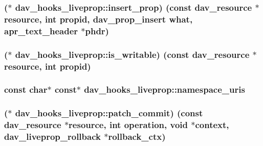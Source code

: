 \subsubsection[{\texorpdfstring{insert\+\_\+prop}{insert_prop}}]{($\ast$ dav\+\_\+hooks\+\_\+liveprop\+::insert\+\_\+prop) (const {\bf dav\+\_\+resource} $\ast${\bf resource}, {\bf int} propid, {\bf dav\+\_\+prop\+\_\+insert} {\bf what}, {\bf apr\+\_\+text\+\_\+header} $\ast${\bf phdr})}\hypertarget{structdav__hooks__liveprop_ab141270827afd7235865bc6fd9fe1b9f}{}\label{structdav__hooks__liveprop_ab141270827afd7235865bc6fd9fe1b9f}
\subsubsection[{\texorpdfstring{is\+\_\+writable}{is_writable}}]{($\ast$ dav\+\_\+hooks\+\_\+liveprop\+::is\+\_\+writable) (const {\bf dav\+\_\+resource} $\ast${\bf resource}, {\bf int} propid)}\hypertarget{structdav__hooks__liveprop_a0d480e2040b1df37742cfe0db87df757}{}\label{structdav__hooks__liveprop_a0d480e2040b1df37742cfe0db87df757}
\subsubsection[{\texorpdfstring{namespace\+\_\+uris}{namespace_uris}}]{\setlength{\rightskip}{0pt plus 5cm}const char$\ast$ const$\ast$ dav\+\_\+hooks\+\_\+liveprop\+::namespace\+\_\+uris}\hypertarget{structdav__hooks__liveprop_a7f85e5fc26d7c02d682e80c1e0ccf473}{}\label{structdav__hooks__liveprop_a7f85e5fc26d7c02d682e80c1e0ccf473}
\subsubsection[{\texorpdfstring{patch\+\_\+commit}{patch_commit}}]{($\ast$ dav\+\_\+hooks\+\_\+liveprop\+::patch\+\_\+commit) (const {\bf dav\+\_\+resource} $\ast${\bf resource}, {\bf int} {\bf operation}, {\bf void} $\ast${\bf context}, {\bf dav\+\_\+liveprop\+\_\+rollback} $\ast$rollback\+\_\+ctx)}\hypertarget{structdav__hooks__liveprop_aa05f0af2c09d62471e647ecabc49a47b}{}\label{structdav__hooks__liveprop_aa05f0af2c09d62471e647ecabc49a47b}
